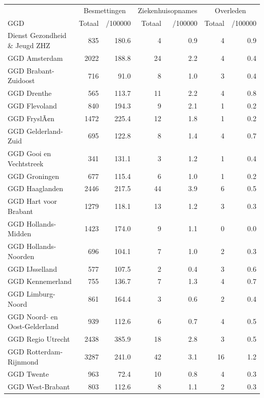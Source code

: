 \documentclass[
  english,
  man,floatsintext]{apa6}
\begin{document}
\begin{table}
\centering\begingroup\fontsize{10}{12}\selectfont

\begin{threeparttable}
\begin{tabular}{lrrrrrr}
\toprule
\multicolumn{1}{c}{ } & \multicolumn{2}{c}{Besmettingen} & \multicolumn{2}{c}{Ziekenhuisopnames} & \multicolumn{2}{c}{Overleden} \\
\cmidrule(l{3pt}r{3pt}){2-3} \cmidrule(l{3pt}r{3pt}){4-5} \cmidrule(l{3pt}r{3pt}){6-7}
GGD & Totaal & /100000 & Totaal & /100000 & Totaal & /100000\\
\midrule
Dienst Gezondheid \& Jeugd ZHZ & 835 & 180.6 & 4 & 0.9 & 4 & 0.9\\
GGD Amsterdam & 2022 & 188.8 & 24 & 2.2 & 4 & 0.4\\
GGD Brabant-Zuidoost & 716 & 91.0 & 8 & 1.0 & 3 & 0.4\\
GGD Drenthe & 565 & 113.7 & 11 & 2.2 & 4 & 0.8\\
GGD Flevoland & 840 & 194.3 & 9 & 2.1 & 1 & 0.2\\
GGD FryslÃ¢n & 1472 & 225.4 & 12 & 1.8 & 1 & 0.2\\
GGD Gelderland-Zuid & 695 & 122.8 & 8 & 1.4 & 4 & 0.7\\
GGD Gooi en Vechtstreek & 341 & 131.1 & 3 & 1.2 & 1 & 0.4\\
GGD Groningen & 677 & 115.4 & 6 & 1.0 & 1 & 0.2\\
GGD Haaglanden & 2446 & 217.5 & 44 & 3.9 & 6 & 0.5\\
GGD Hart voor Brabant & 1279 & 118.1 & 13 & 1.2 & 3 & 0.3\\
GGD Hollands-Midden & 1423 & 174.0 & 9 & 1.1 & 0 & 0.0\\
GGD Hollands-Noorden & 696 & 104.1 & 7 & 1.0 & 2 & 0.3\\
GGD IJsselland & 577 & 107.5 & 2 & 0.4 & 3 & 0.6\\
GGD Kennemerland & 755 & 136.7 & 7 & 1.3 & 4 & 0.7\\
GGD Limburg-Noord & 861 & 164.4 & 3 & 0.6 & 2 & 0.4\\
GGD Noord- en Oost-Gelderland & 939 & 112.6 & 6 & 0.7 & 4 & 0.5\\
GGD Regio Utrecht & 2438 & 385.9 & 18 & 2.8 & 3 & 0.5\\
GGD Rotterdam-Rijnmond & 3287 & 241.0 & 42 & 3.1 & 16 & 1.2\\
GGD Twente & 963 & 72.4 & 10 & 0.8 & 4 & 0.3\\
GGD West-Brabant & 803 & 112.6 & 8 & 1.1 & 2 & 0.3\\

\end{tabular}
\end{threeparttable}
\end{table}
\end{document}
